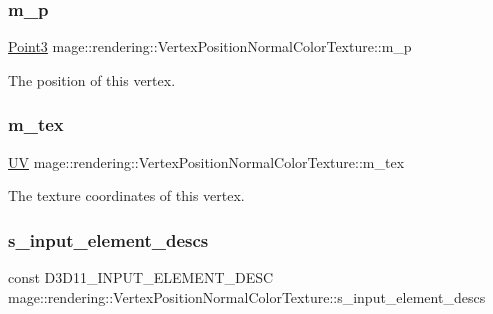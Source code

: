\subsubsection{\texorpdfstring{m\+\_\+p}{m\_p}}
{\footnotesize\ttfamily \hyperlink{structmage_1_1_point3}{Point3} mage\+::rendering\+::\+Vertex\+Position\+Normal\+Color\+Texture\+::m\+\_\+p}

The position of this vertex. \hypertarget{structmage_1_1rendering_1_1_vertex_position_normal_color_texture_a3c964b9b06e3bcc59b33fc1a273c13a7}{}\label{structmage_1_1rendering_1_1_vertex_position_normal_color_texture_a3c964b9b06e3bcc59b33fc1a273c13a7} 
\subsubsection{\texorpdfstring{m\+\_\+tex}{m\_tex}}
{\footnotesize\ttfamily \hyperlink{structmage_1_1_u_v}{UV} mage\+::rendering\+::\+Vertex\+Position\+Normal\+Color\+Texture\+::m\+\_\+tex}

The texture coordinates of this vertex. \hypertarget{structmage_1_1rendering_1_1_vertex_position_normal_color_texture_a7776f639d08c1612e9faa5a328e1ea7b}{}\label{structmage_1_1rendering_1_1_vertex_position_normal_color_texture_a7776f639d08c1612e9faa5a328e1ea7b} 
\subsubsection{\texorpdfstring{s\+\_\+input\+\_\+element\+\_\+descs}{s\_input\_element\_descs}}
{\footnotesize\ttfamily const D3\+D11\+\_\+\+I\+N\+P\+U\+T\+\_\+\+E\+L\+E\+M\+E\+N\+T\+\_\+\+D\+E\+SC mage\+::rendering\+::\+Vertex\+Position\+Normal\+Color\+Texture\+::s\+\_\+input\+\_\+element\+\_\+descs\hspace{0.3cm}{\ttfamily [static]}}

